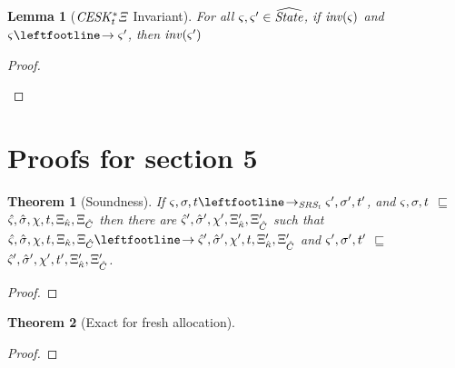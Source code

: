 \documentclass{article}
\newtheorem{theorem}{Theorem}
\newtheorem{lemma}{Lemma}
\begin{document}
\begin{lemma}[$\mathit{CESK^*_t\Xi}$ Invariant]\label{lem:invariant}
  For all $\varsigma,\varsigma' \in \widehat{\mathit{State}}$, if $\mathit{inv}(\varsigma)$ and $\mstate \stepto \mstate'$, then $\mathit{inv}(\varsigma')$
\end{lemma}
\begin{proof}
      \begin{byCases}



      \end{byCases}
\end{proof}

\section{Proofs for section 5}

\begin{theorem}[Soundness]
  If $\mstate,\mstore,\mtime \stepto_{\SRSt} \mstate',\mstore',\mtime'$, and $\varsigma,\sigma,t$ $\sqsubseteq$ $\hat\varsigma,\hat\sigma,\chi,t,\Xi_{\hat{\kappa}},\Xi_{\hat{C}}$ then there are $\hat\varsigma',\hat\sigma',\chi',\Xi_{\hat{\kappa}}',\Xi_{\hat{C}}'$ such that $\mastate,\mastore,\mmktab,\mtime,\mktab_{\makont},\mktab_{\mamkont} \stepto \mastate',\mastore',\mmktab',\mtime,\mktab_{\makont}',\mktab_{\mamkont}'$ and
$\varsigma',\sigma',t'$ $\sqsubseteq$ $\hat\varsigma',\hat\sigma',\chi',t',\Xi_{\hat{\kappa}}',\Xi_{\hat{C}}'$.
\end{theorem}
\begin{proof}
\end{proof}

\begin{theorem}[Exact for fresh allocation]
\end{theorem}
\begin{proof}
\end{proof}
\end{document}

